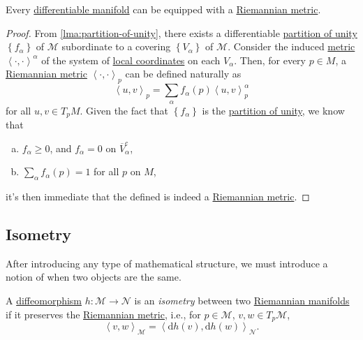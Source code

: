 \begin{theorem}
	Every \hyperref[def:smooth-manifold]{differentiable manifold} can be equipped with a \hyperref[def:Riemannian-metric]{Riemannian metric}.
\end{theorem}
\begin{proof}
	From \autoref{lma:partition-of-unity}, there exists a differentiable \hyperref[def:partition-of-unity]{partition of unity} \(\left\{ f_\alpha  \right\} \) of \(\mathcal{M} \) subordinate to a covering \(\left\{ V_\alpha \right\} \) of \(\mathcal{M} \). Consider the induced \hyperref[def:Riemannian-metric]{metric} \( \left\langle \cdot, \cdot \right\rangle ^{\alpha }\) of the system of \hyperref[def:coordinate-chart]{local coordinates} on each \(V_\alpha \). Then, for every \(p\in M\), a \hyperref[def:Riemannian-metric]{Riemannian metric} \(\left\langle \cdot, \cdot \right\rangle _p\) can be defined naturally as
	\[
		\left\langle u, v \right\rangle _p = \sum_{\alpha } f_\alpha (p)\left\langle u, v \right\rangle _p^\alpha
	\]
	for all \(u, v\in T_p M \). Given the fact that \(\left\{ f_\alpha  \right\} \) is the \hyperref[def:partition-of-unity]{partition of unity}, we know that
	\begin{enumerate}[(a)]
		\item \(f_\alpha \geq 0\), and \(f_\alpha = 0\) on \(\overline{V} _\alpha ^{c} \),
		\item \(\sum_{\alpha } f_\alpha (p) = 1\) for all \(p\) on \(M\),
	\end{enumerate}
	it's then immediate that the defined is indeed a \hyperref[def:Riemannian-metric]{Riemannian metric}.
\end{proof}

\subsection{Isometry}
After introducing any type of mathematical structure, we must introduce a notion of when two objects are the same.

\begin{definition}[Isometry]\label{def:isometry}
	A \hyperref[def:diffeomorphism]{diffeomorphism} \(h\colon \mathcal{M} \to \mathcal{N} \) is an \emph{isometry} between two \hyperref[def:Riemannian-manifold]{Riemannian manifolds} if it preserves the \hyperref[def:Riemannian-metric]{Riemannian metric}, i.e., for \(p\in \mathcal{M} \), \(v, w\in T_p \mathcal{M} \),
	\[
		\left\langle v, w \right\rangle _{\mathcal{M} } = \left\langle \mathrm{d} h(v), \mathrm{d} h(w) \right\rangle _{\mathcal{N} }.
	\]
\end{definition}


